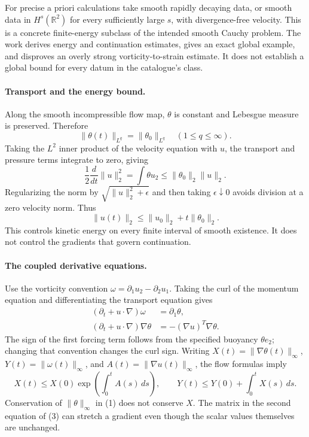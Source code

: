 \documentclass[11pt]{article}
\begin{document}
For precise a priori calculations take smooth rapidly decaying data,
or smooth data in $H^s(\mathbb R^2)$ for every sufficiently large $s$,
with divergence-free velocity. This is a concrete finite-energy
subclass of the intended smooth Cauchy problem. The work derives
energy and continuation estimates, gives an exact global example,
and disproves an overly strong vorticity-to-strain estimate. It does
not establish a global bound for every datum in the catalogue's class.

\paragraph{Transport and the energy bound.}
Along the smooth incompressible flow map, $\theta$ is constant and
Lebesgue measure is preserved. Therefore
\[
                  \|\theta(t)\|_{L^q}=\|\theta_0\|_{L^q}
                 \quad(1\le q\le\infty).               \tag{1}
\]
Taking the $L^2$ inner product of the velocity equation with $u$,
the transport and pressure terms integrate to zero, giving
\[
 \frac12\frac d{dt}\|u\|_2^2=\int\theta u_2
                      \le\|\theta_0\|_2\|u\|_2.
\]
Regularizing the norm by $\sqrt{\|u\|_2^2+\epsilon}$ and then taking
$\epsilon\downarrow0$ avoids division at a zero velocity norm. Thus
\[
                  \|u(t)\|_2\le\|u_0\|_2+t\|\theta_0\|_2.\tag{2}
\]
This controls kinetic energy on every finite interval of smooth
existence. It does not control the gradients that govern continuation.

\paragraph{The coupled derivative equations.}
Use the vorticity convention $\omega=\partial_1u_2-\partial_2u_1$.
Taking the curl of the momentum equation and differentiating the
transport equation gives
\[
 \begin{split}
 (\partial_t+u\cdot\nabla)\omega&=\partial_1\theta,\\
 (\partial_t+u\cdot\nabla)\nabla\theta
                           &=-(\nabla u)^T\nabla\theta.
 \end{split}                                             \tag{3}
\]
The sign of the first forcing term follows from the specified buoyancy
$\theta e_2$; changing that convention changes the curl sign.
Writing $X(t)=\|\nabla\theta(t)\|_\infty$,
$Y(t)=\|\omega(t)\|_\infty$, and $A(t)=\|\nabla u(t)\|_\infty$,
the flow formulas imply
\[
 X(t)\le X(0)\exp\left(\int_0^tA(s)\,ds\right),\qquad
 Y(t)\le Y(0)+\int_0^tX(s)\,ds.                         \tag{4}
\]
Conservation of $\|\theta\|_\infty$ in (1) does not conserve $X$.
The matrix in the second equation of (3) can stretch a gradient even
though the scalar values themselves are unchanged.
\end{document}

